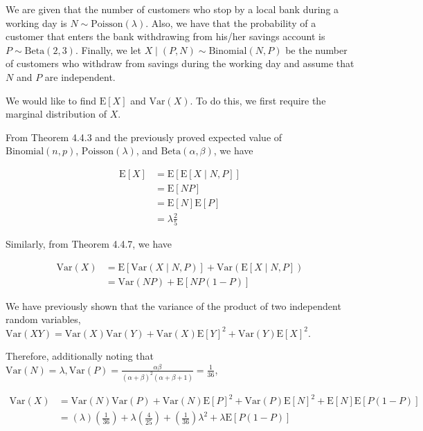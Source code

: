 \documentclass[11pt]{article}
\begin{document}
We are given that the number of customers who stop by a local bank
during a working day is $N \sim \mathrm{Poisson}(\lambda)$.  Also, we
have that the probability of a customer that enters the bank
withdrawing from his/her savings account is $P \sim
\mathrm{Beta}(2,3)$.  Finally, we let $X \mid (P,N) \sim
\mathrm{Binomial}(N,P)$ be the number of customers who withdraw from
savings during the working day and assume that $N$ and $P$ are
independent.

We would like to find $\mathrm{E}[X]$ and $\mathrm{Var}(X)$.  To do
this, we first require the marginal distribution of $X$.

From Theorem 4.4.3 and the previously proved expected value of
$\mathrm{Binomial}(n,p)$, $\mathrm{Poisson}(\lambda)$, and
$\mathrm{Beta}(\alpha, \beta)$, we have

\begin{align*}
  \mathrm{E}[X] &= \mathrm{E}[\mathrm{E}[X \mid N,P]] \\
  &= \mathrm{E}[NP] \\
  &= \mathrm{E}[N] \mathrm{E}[P] \\
  &= \lambda \frac{2}{5}
\end{align*}

Similarly, from Theorem 4.4.7, we have

\begin{align*}
  \mathrm{Var}(X) &= \mathrm{E}[\mathrm{Var}(X \mid N,P)] +
                    \mathrm{Var}(\mathrm{E}[X \mid N,P]) \\
  &= \mathrm{Var}(NP) + \mathrm{E}[NP(1-P)]
\end{align*}

We have previously shown that the variance of the product of two
independent random variables, $\mathrm{Var}(XY) = \mathrm{Var}(X)
\mathrm{Var}(Y) + \mathrm{Var}(X) \mathrm{E}[Y]^2 + \mathrm{Var}(Y)
\mathrm{E}[X]^2$.

Therefore, additionally noting that $\mathrm{Var}(N) = \lambda,
\mathrm{Var}(P) = \frac{\alpha
  \beta}{(\alpha+\beta)^2(\alpha+\beta+1)} = \frac{1}{36}$,

\begin{align*}
  \mathrm{Var}(X) &= \mathrm{Var}(N) \mathrm{Var}(P) +
                    \mathrm{Var}(N)\mathrm{E}[P]^2 + \mathrm{Var}(P)
                    \mathrm{E}[N]^2 + \mathrm{E}[N] \mathrm{E}[P(1-P)]
  \\
  &= (\lambda)\left(\frac{1}{36}\right) + \lambda \left( \frac{4}{25}
    \right) + \left( \frac{1}{36} \right) \lambda^2 + \lambda \mathrm{E}[P(1-P)]
\end{align*}
\end{document}
